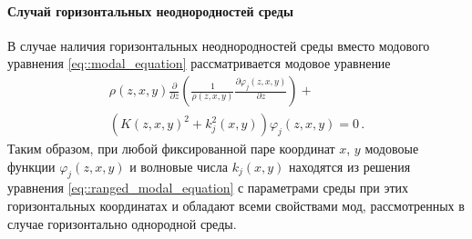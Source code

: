 \documentclass{fefu}
\newcommand{\pa}[1]{\left(#1\right)}
\begin{document}
                \paragraph{Случай горизонтальных неоднородностей среды}
                    \par В случае наличия горизонтальных неоднородностей среды вместо модового уравнения \eqref{eq::modal_equation} рассматривается модовое уравнение 
                    \begin{multline}\label{eq::ranged_modal_equation}
                        \rho\pa{z,x,y}\frac{\partial}{\partial z}\pa{\frac{1}{\rho\pa{z,x,y}}\frac{\partial\varphi_j\pa{z,x,y}}{\partial z}}+\\
                        \pa{K\pa{z,x,y}^2+k_j^2\pa{x,y}}\varphi_j\pa{z,x,y}=0\,.
                    \end{multline}
                    Таким образом, при любой фиксированной паре координат $x$, $y$ модовоые функции $\varphi_j\pa{z,x,y}$ и волновые числа $k_j\pa{x,y}$ находятся из решения уравнения \eqref{eq::ranged_modal_equation} с параметрами среды при этих горизонтальных координатах и обладают всеми свойствами мод, рассмотренных в случае горизонтально однородной среды. 
\end{document}
